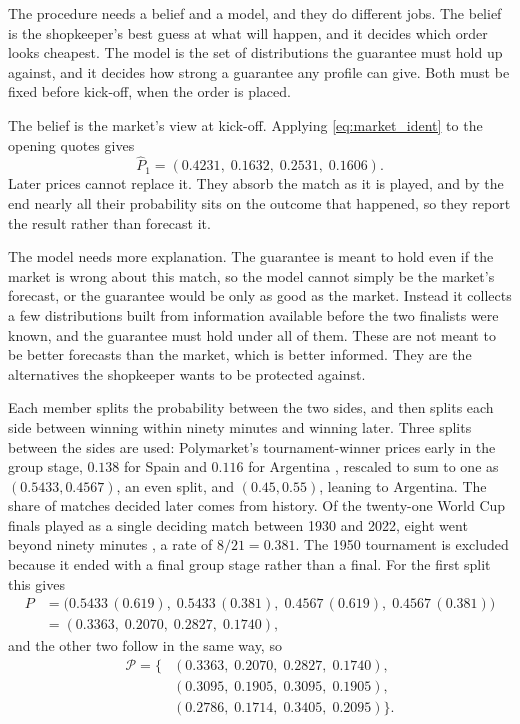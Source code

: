 The procedure needs a belief and a model, and they do different jobs. The
belief is the shopkeeper's best guess at what will happen, and it decides
which order looks cheapest. The model is the set of distributions the
guarantee must hold up against, and it decides how strong a guarantee any
profile can give. Both must be fixed before kick-off, when the order is
placed.

The belief is the market's view at kick-off. Applying \eqref{eq:market_ident}
to the opening quotes gives
\[
  \widehat P_1=(0.4231,\;0.1632,\;0.2531,\;0.1606).
\]
Later prices cannot replace it. They absorb the match as it is played, and by
the end nearly all their probability sits on the outcome that happened, so
they report the result rather than forecast it.

The model needs more explanation. The guarantee is meant to hold even if the
market is wrong about this match, so the model cannot simply be the market's
forecast, or the guarantee would be only as good as the market. Instead it
collects a few distributions built from information available before the two
finalists were known, and the guarantee must hold under all of them.
These are not meant to be better forecasts than the market, which is better
informed. They are the alternatives the shopkeeper wants to be protected
against.

Each member splits the probability between the two sides, and then splits
each side between winning within ninety minutes and winning later. Three
splits between the sides are used: Polymarket's tournament-winner prices
early in the group stage, $0.138$ for Spain and $0.116$ for Argentina
\citep{PolymarketWinner2026}, rescaled to sum to one as
$(0.5433,0.4567)$, an even split, and $(0.45,0.55)$, leaning to Argentina. The share of matches decided later
comes from history. Of the twenty-one World Cup finals played as a single
deciding match between 1930 and 2022, eight went beyond ninety minutes
\citep{WCfinalsList}, a rate of $8/21=0.381$. The 1950 tournament is excluded
because it ended with a final group stage rather than a final. For the first
split this gives
\[
\begin{aligned}
  P&=\bigl(0.5433\,(0.619),\;0.5433\,(0.381),\;
             0.4567\,(0.619),\;0.4567\,(0.381)\bigr)\\
   &=(0.3363,\;0.2070,\;0.2827,\;0.1740),
\end{aligned}
\]
and the other two follow in the same way, so
\[
\begin{aligned}
  \mathcal P=\bigl\{&(0.3363,\;0.2070,\;0.2827,\;0.1740),\\
                    &(0.3095,\;0.1905,\;0.3095,\;0.1905),\\
                    &(0.2786,\;0.1714,\;0.3405,\;0.2095)\bigr\}.
\end{aligned}
\]

